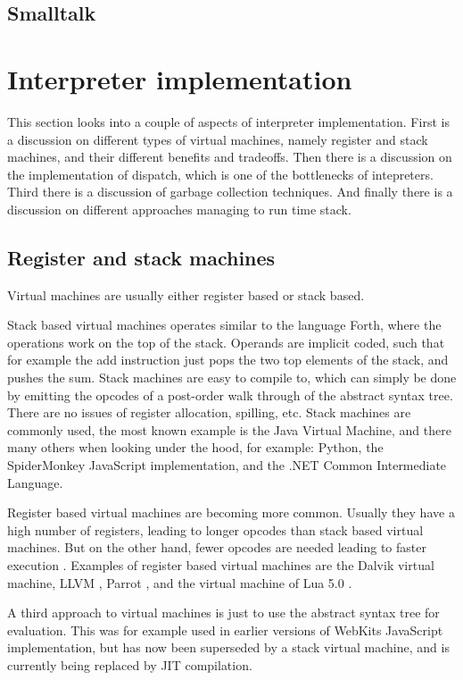 \documentclass[11pt]{report}
\begin{document}
\subsection{Smalltalk}

\section{Interpreter implementation}
\label{interpreter-implementation}
This section looks into a couple of aspects of interpreter implementation.
First is a discussion on different types of virtual machines, namely register and stack machines, and their different benefits and tradeoffs.
Then there is a discussion on the implementation of dispatch, which is one of the bottlenecks of intepreters.
Third there is a discussion of garbage collection techniques.
And finally there is a discussion on different approaches managing to run time stack.

\subsection{Register and stack machines}
Virtual machines are usually either register based or stack based.

Stack based virtual machines operates similar to the language Forth, where the operations work on the top of the stack. 
Operands are implicit coded, such that for example the add instruction just pops the two top elements of the stack, and pushes the sum. 
Stack machines are easy to compile to, 
which can simply be done by emitting the opcodes of a post-order walk through of the abstract syntax tree. 
There are no issues of register allocation, spilling, etc.
Stack machines are commonly used, the most known example is the Java Virtual Machine, and there many others when looking under the hood, for example: Python, the SpiderMonkey JavaScript implementation, and the .NET Common Intermediate Language.

Register based virtual machines are becoming more common. 
Usually they have a high number of registers, leading to longer opcodes than stack based virtual machines. But on the other hand, fewer opcodes are needed leading to faster execution \cite{register-vs-stack1, register-vs-stack2}. 
Examples of register based virtual machines are the Dalvik \cite{dalvik-vm} virtual machine, LLVM \cite{llvm}, Parrot \cite{parrot}, and the virtual machine of Lua 5.0 \cite{luavm}.

A third approach to virtual machines is just to use the abstract syntax tree for evaluation. This was for example used in earlier versions of WebKits JavaScript implementation, but has now been superseded by a stack virtual machine, and is currently being replaced by JIT compilation.
\end{document}
